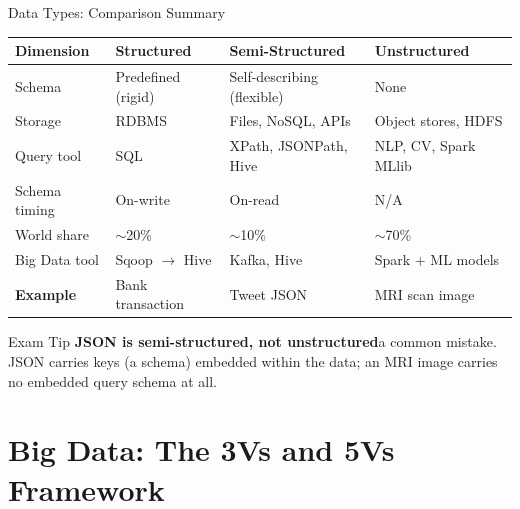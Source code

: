 \documentclass[aspectratio=169,10pt]{beamer}
\begin{document}
\begin{frame}{Data Types: Comparison Summary}
  \centering
  \renewcommand{\arraystretch}{1.4}
  \begin{tabular}{p{2.4cm}p{3.5cm}p{3.5cm}p{3.5cm}}
    \toprule
    \textbf{Dimension} & \textbf{Structured} & \textbf{Semi-Structured} & \textbf{Unstructured} \\
    \midrule
    Schema & Predefined (rigid) & Self-describing (flexible) & None \\
    Storage & RDBMS & Files, NoSQL, APIs & Object stores, HDFS \\
    Query tool & SQL & XPath, JSONPath, Hive & NLP, CV, Spark MLlib \\
    Schema timing & On-write & On-read & N/A \\
    World share & $\sim$20\% & $\sim$10\% & $\sim$70\% \\
    Big Data tool & Sqoop $\to$ Hive & Kafka, Hive & Spark + ML models \\
    \textbf{Example} & Bank transaction & Tweet JSON & MRI scan image \\
    \bottomrule
  \end{tabular}
  \vspace{8pt}
  \begin{alertblock}{Exam Tip}
    \textbf{JSON is semi-structured, not unstructured}\textemdash a common mistake.  JSON carries keys (a schema) embedded within the data; an MRI image carries no embedded query schema at all.
  \end{alertblock}
\end{frame}

\section{Big Data: The 3Vs and 5Vs Framework}
\end{document}
